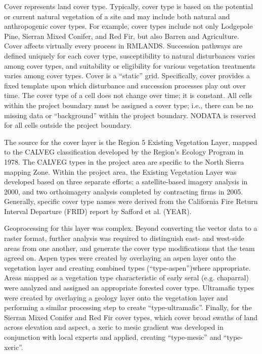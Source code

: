 Cover represents land cover type. Typically, cover type is based on the potential or current natural vegetation of a site and may include both natural and anthropogenic cover types. For example, cover types include not only Lodgepole Pine, Sierran Mixed Conifer, and Red Fir, but also Barren and Agriculture. Cover affects virtually every process in RMLANDS. Succession pathways are defined uniquely for each cover type, susceptibility to natural disturbances varies among cover types, and suitability or eligibility for various vegetation treatments varies among cover types. Cover is a ``static'' grid. Specifically, cover provides a fixed template upon which disturbance and succession processes play out over time. The cover type of a cell does not change over time; it is constant. All cells within the project boundary must be assigned a cover type; i.e., there can be no missing data or “background” within the project boundary. NODATA is reserved for all cells outside the project boundary.

The source for the cover layer is the Region 5 Existing Vegetation Layer, mapped to the CALVEG classification developed by the Region's Ecology Program in 1978. The CALVEG types in the project area are specific to the North Sierra mapping Zone. Within the project area, the Existing Vegetation Layer was developed based on three separate efforts: a satellite-based imagery analysis in 2000, and two orthoimagery analysis completed by contracting firms in 2005. Generally, specific cover type names were derived from the California Fire Return Interval Departure (FRID) report by Safford et al. (YEAR).

Geoprocessing for this layer was complex. Beyond converting the vector data to a raster format, further analysis was required to distinguish east- and west-side areas from one another, and generate the cover type modifications that the team agreed on. Aspen types were created by overlaying an aspen layer onto the vegetation layer and creating combined types (``type-aspen'')where appropriate. Areas mapped as a vegetation type characteristic of early seral (e.g. chaparral) were analyzed and assigned an appropriate forested cover type. Ultramafic types were created by overlaying a geology layer onto the vegetation layer and performing a similar processing step to create ``type-ultramafic''. Finally, for the Sierran Mixed Conifer and Red Fir cover types, which cover broad swaths of land across elevation and aspect, a xeric to mesic gradient was developed in conjunction with local experts and applied, creating ``type-mesic'' and ``type-xeric''.

